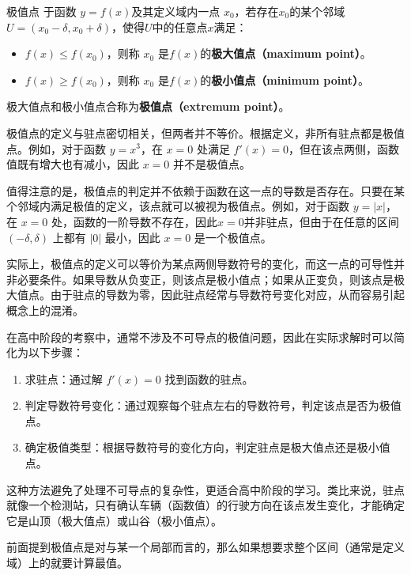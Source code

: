 \begin{definition}{极值点}
于函数 $y=f(x)$及其定义域内一点 $x_0$，若存在$x_0$的某个邻域$U=\left( x_0-\delta,x_0+\delta \right)$，使得$U$中的任意点$x$满足：
\begin{itemize}
\item $f(x) \leq f\left(x_0\right)$，则称 $x_0$ 是$f(x)$的\textbf{极大值点（maximum point）}。
\item $f(x) \geq f\left(x_0\right)$，则称 $x_0$ 是$f(x)$的\textbf{极小值点（minimum point）}。
\end{itemize}
极大值点和极小值点合称为\textbf{极值点（extremum point）}。
\end{definition}

极值点的定义与驻点密切相关，但两者并不等价。根据定义，非所有驻点都是极值点。例如，对于函数 $y = x^3$，在 $x = 0$ 处满足 $f'(x) = 0$，但在该点两侧，函数值既有增大也有减小，因此 $x = 0$ 并不是极值点。

值得注意的是，极值点的判定并不依赖于函数在这一点的导数是否存在。只要在某个邻域内满足极值的定义，该点就可以被视为极值点。例如，对于函数 $y = |x|$，在 $x = 0$ 处，函数的一阶导数不存在，因此$x = 0$并非驻点，但由于在任意的区间 $(-\delta, \delta)$ 上都有 $|0|$ 最小，因此 $x = 0$ 是一个极值点。

实际上，极值点的定义可以等价为某点两侧导数符号的变化，而这一点的可导性并非必要条件。如果导数从负变正，则该点是极小值点；如果从正变负，则该点是极大值点。由于驻点的导数为零，因此驻点经常与导数符号变化对应，从而容易引起概念上的混淆。

在高中阶段的考察中，通常不涉及不可导点的极值问题，因此在实际求解时可以简化为以下步骤：
\begin{enumerate}
\item 求驻点：通过解 $f'(x) = 0$ 找到函数的驻点。
\item 判定导数符号变化：通过观察每个驻点左右的导数符号，判定该点是否为极值点。
\item 确定极值类型：根据导数符号的变化方向，判定驻点是极大值点还是极小值点。
\end{enumerate}

这种方法避免了处理不可导点的复杂性，更适合高中阶段的学习。类比来说，驻点就像一个检测站，只有确认车辆（函数值）的行驶方向在该点发生变化，才能确定它是山顶（极大值点）或山谷（极小值点）。

前面提到极值点是对与某一个局部而言的，那么如果想要求整个区间（通常是定义域）上的就要计算最值。


